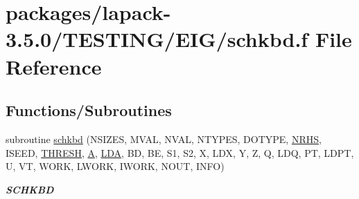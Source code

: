 \hypertarget{schkbd_8f}{}\section{packages/lapack-\/3.5.0/\+T\+E\+S\+T\+I\+N\+G/\+E\+I\+G/schkbd.f File Reference}
\label{schkbd_8f}
\subsection*{Functions/\+Subroutines}
\begin{DoxyCompactItemize}
\item 
subroutine \hyperlink{group__single__eig_ga03e7367f702235ab4a852cec4d6dd1c8}{schkbd} (N\+S\+I\+Z\+E\+S, M\+V\+A\+L, N\+V\+A\+L, N\+T\+Y\+P\+E\+S, D\+O\+T\+Y\+P\+E, \hyperlink{example__user_8c_aa0138da002ce2a90360df2f521eb3198}{N\+R\+H\+S}, I\+S\+E\+E\+D, \hyperlink{zlaqgs_8c_a0656018abfc9fa2821827415f5d5ea57}{T\+H\+R\+E\+S\+H}, \hyperlink{classA}{A}, \hyperlink{example__user_8c_ae946da542ce0db94dced19b2ecefd1aa}{L\+D\+A}, B\+D, B\+E, S1, S2, X, L\+D\+X, Y, Z, Q, L\+D\+Q, P\+T, L\+D\+P\+T, U, V\+T, W\+O\+R\+K, L\+W\+O\+R\+K, I\+W\+O\+R\+K, N\+O\+U\+T, I\+N\+F\+O)
\begin{DoxyCompactList}\small\item\em {\bfseries S\+C\+H\+K\+B\+D} \end{DoxyCompactList}\end{DoxyCompactItemize}
